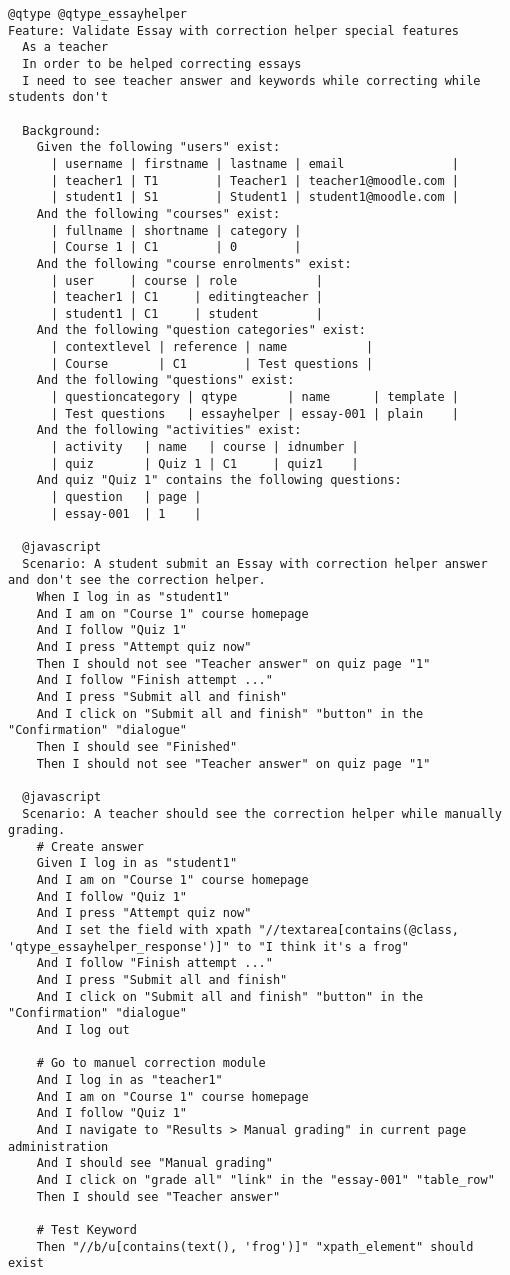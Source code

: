 \begin{lstlisting}[language=behat,frame=l,style=default]
@qtype @qtype_essayhelper
Feature: Validate Essay with correction helper special features
  As a teacher
  In order to be helped correcting essays
  I need to see teacher answer and keywords while correcting while students don't

  Background:
    Given the following "users" exist:
      | username | firstname | lastname | email               |
      | teacher1 | T1        | Teacher1 | teacher1@moodle.com |
      | student1 | S1        | Student1 | student1@moodle.com |
    And the following "courses" exist:
      | fullname | shortname | category |
      | Course 1 | C1        | 0        |
    And the following "course enrolments" exist:
      | user     | course | role           |
      | teacher1 | C1     | editingteacher |
      | student1 | C1     | student        |
    And the following "question categories" exist:
      | contextlevel | reference | name           |
      | Course       | C1        | Test questions |
    And the following "questions" exist:
      | questioncategory | qtype       | name      | template |
      | Test questions   | essayhelper | essay-001 | plain    |
    And the following "activities" exist:
      | activity   | name   | course | idnumber |
      | quiz       | Quiz 1 | C1     | quiz1    |
    And quiz "Quiz 1" contains the following questions:
      | question   | page |
      | essay-001  | 1    |

  @javascript
  Scenario: A student submit an Essay with correction helper answer and don't see the correction helper.
    When I log in as "student1"
    And I am on "Course 1" course homepage
    And I follow "Quiz 1"
    And I press "Attempt quiz now"
    Then I should not see "Teacher answer" on quiz page "1"
    And I follow "Finish attempt ..."
    And I press "Submit all and finish"
    And I click on "Submit all and finish" "button" in the "Confirmation" "dialogue"
    Then I should see "Finished"
    Then I should not see "Teacher answer" on quiz page "1"

  @javascript
  Scenario: A teacher should see the correction helper while manually grading.
    # Create answer
    Given I log in as "student1"
    And I am on "Course 1" course homepage
    And I follow "Quiz 1"
    And I press "Attempt quiz now"
    And I set the field with xpath "//textarea[contains(@class, 'qtype_essayhelper_response')]" to "I think it's a frog"
    And I follow "Finish attempt ..."
    And I press "Submit all and finish"
    And I click on "Submit all and finish" "button" in the "Confirmation" "dialogue"
    And I log out

    # Go to manuel correction module
    And I log in as "teacher1"
    And I am on "Course 1" course homepage
    And I follow "Quiz 1"
    And I navigate to "Results > Manual grading" in current page administration
    And I should see "Manual grading"
    And I click on "grade all" "link" in the "essay-001" "table_row"
    Then I should see "Teacher answer"

    # Test Keyword
    Then "//b/u[contains(text(), 'frog')]" "xpath_element" should exist
\end{lstlisting}

